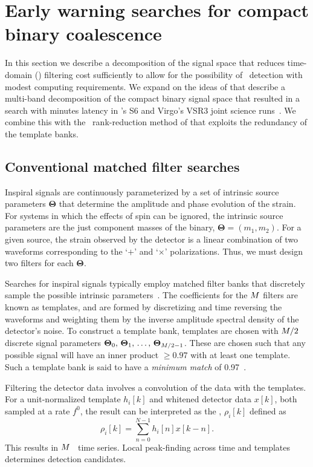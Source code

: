 \section{Early warning searches for compact binary coalescence}
\label{sec:method}

In this section we describe a decomposition of the \CBC{} signal space that
reduces time-domain (\TD) filtering cost sufficiently to allow for the
possibility of \earlywarning\ detection with modest computing requirements.  We
expand on the ideas of \citet{Marion2004, Buskulic2010} that describe a
multi-band decomposition of the compact binary signal space that resulted in
a search with minutes latency in \LIGO{}'s S6 and Virgo's VSR3 joint science
runs~\citep{HugheyGWPAW2011}.  We combine this with the \SVD\ rank-reduction
method of \citet{Cannon:2010p10398} that exploits the redundancy of
the template banks.

\subsection{Conventional \CBC{} matched filter searches}

Inspiral signals are continuously parameterized by a set of intrinsic source
parameters $\mathbf\Theta$ that determine the amplitude and phase evolution of the
\GW{} strain. For systems in which the effects of spin can be ignored, the intrinsic
source parameters are the just component masses of the binary,
 $\mathbf\Theta = (m_1, m_2)$. For a given source, the strain observed by the
 detector is a linear combination of two waveforms corresponding to the
`$+$' and `$\times$' \GW{} polarizations.  Thus, we must design two filters
for each $\mathbf\Theta$.

Searches for inspiral signals typically employ matched filter
banks that discretely sample the possible intrinsic parameters~\citep{findchirppaper}.
The coefficients for the $M$ filters are known as templates, 
and are formed by discretizing and time reversing the
waveforms and weighting them by the inverse amplitude spectral density of the
detector's noise.
To construct a template bank, templates are chosen with
$M/2$ discrete signal parameters $\mathbf\Theta_0,\, \mathbf\Theta_1,\, \dots,\,
\mathbf\Theta_{M/2-1}$. These are chosen such that any possible signal
will have an inner product $\geqslant 0.97$ with at least one template.
Such a template bank is said to have a {\em minimum match} of 0.97~\citep{Owen:1998dk}.

Filtering the detector data involves a convolution of the data with the
templates.  For a unit-normalized template $h_i[k]$ and whitened detector data
$x[k]$, both sampled at a rate $f^0$, the result can be interpreted as the
\SNR{}, $\rho_i[k]$ defined as
%
%
\begin{equation}
	\label{eq:SNRTD}
	\rho_i [k] = \sum_{n=0}^{N-1} h_{i}[n] x [k-n].
\end{equation}
This results in $M$ \SNR\ time series. Local peak-finding across time and
templates determines detection candidates.

